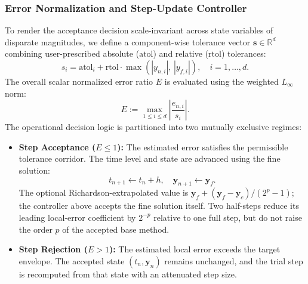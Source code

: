 \subsubsection{Error Normalization and Step-Update Controller}
To render the acceptance decision scale-invariant across state variables of disparate magnitudes, we define a component-wise tolerance vector $\mathbf{s} \in \mathbb{R}^d$ combining user-prescribed absolute ($\text{atol}$) and relative ($\text{rtol}$) tolerances:
\begin{equation}
\label{eq:scale_vector}
s_i = \text{atol}_i + \text{rtol} \cdot \max\left(|y_{n, i}|, \, |y_{f, i}|\right), \quad i = 1, \dots, d.
\end{equation}
The overall scalar normalized error ratio $E$ is evaluated using the weighted $L_\infty$ norm:
\begin{equation}
\label{eq:normalized_error_ratio}
E := \max_{1 \le i \le d} \left| \frac{\hat{e}_{n, i}}{s_i} \right|.
\end{equation}
The operational decision logic is partitioned into two mutually exclusive regimes:
\begin{itemize}
    \item \textbf{Step Acceptance ($E \le 1$):} The estimated error satisfies the permissible tolerance corridor. The time level and state are advanced using the fine solution:
    \begin{equation}
    \label{eq:accepted_fine_solution}
    t_{n+1} \gets t_n + h, \quad \mathbf{y}_{n+1} \gets \mathbf{y}_f.
    \end{equation}
    The optional Richardson-extrapolated value is $\mathbf{y}_f+(\mathbf{y}_f-\mathbf{y}_c)/(2^p-1)$; the controller above accepts the fine solution itself. Two half-steps reduce its leading local-error coefficient by $2^{-p}$ relative to one full step, but do not raise the order $p$ of the accepted base method.
    \item \textbf{Step Rejection ($E > 1$):} The estimated local error exceeds the target envelope. The accepted state $(t_n,\mathbf{y}_n)$ remains unchanged, and the trial step is recomputed from that state with an attenuated step size.
\end{itemize}

